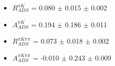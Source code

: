 \begin{itemize}
\item $R_{ADS}^{\pi K}$ = 0.080 $\pm$ 0.015 $\pm$ 0.002
\item $A_{ADS}^{\pi K}$ = 0.194 $\pm$ 0.186 $\pm$ 0.011
\item $R_{ADS}^{\pi K\pi\pi}$ = 0.073 $\pm$ 0.018 $\pm$ 0.002
\item $A_{ADS}^{\pi K\pi\pi}$ = -0.010 $\pm$ 0.243 $\pm$ 0.009
\end{itemize}
